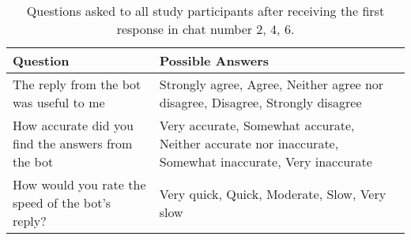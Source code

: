 \renewcommand{\arraystretch}{1.5}
\begin{table}[H]
\centering
{\small
\begin{tabularx}{\textwidth}{@{}X X@{}}
\toprule
\textbf{Question} & \textbf{Possible Answers} \\ \midrule
The reply from the bot was useful to me & Strongly agree, Agree, Neither agree nor disagree, Disagree, Strongly disagree \\ \hdashline
How accurate did you find the answers from the bot & Very accurate, Somewhat accurate, Neither accurate nor inaccurate, Somewhat inaccurate, Very inaccurate \\ \hdashline
How would you rate the speed of the bot's reply? & Very quick, Quick, Moderate, Slow, Very slow \\
\bottomrule
\end{tabularx}
}
\vspace{2mm}
\caption{Questions asked to all study participants after receiving the first response in chat number 2, 4, 6.}
\label{tab:inserted_questions_2_4_6}
\end{table}
